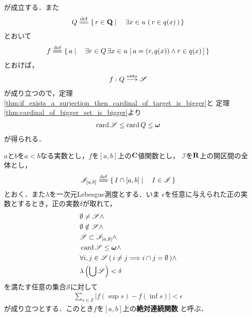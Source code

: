 \begin{sketch}
		が成立する．また
		\begin{align}
			Q \defeq \Set{r \in \Q}{\exists x \in u\, \left(\, r \in q(x)\, \right)}
		\end{align}
		とおいて
		\begin{align}
			f \defeq \Set{a}{\exists r \in Q \, \exists x \in u\, \left[\, a = (r,q(x)) \wedge r \in q(x)\, \right]}
		\end{align}
		とおけば，
		\begin{align}
			f: Q \overset{\mathrm{onto}}{\longrightarrow} \mathscr{S}
		\end{align}
		が成り立つので，定理\ref{thm:if_exists_a_surjection_then_cardinal_of_target_is_bigger}と
		定理\ref{thm:cardinal_of_bigger_set_is_bigger}より
		\begin{align}
			\operatorname{card} \mathscr{S} \leq \operatorname{card} Q \leq {\boldsymbol \omega}
		\end{align}
		が得られる．
		\QED
	\end{sketch}
	
	\begin{screen}
		\begin{dfn}[絶対連続関数]
			$a$と$b$を$a < b$なる実数とし，$f$を$[a,b]$上の$\mathbf{C}$値関数とし，
			$\mathscr{I}$を$\mathbf{R}$上の開区間の全体とし，
			\begin{align}
				\mathscr{I}_{[a,b]} \defeq \Set{I \cap [a,b]}{I \in \mathscr{I}}
			\end{align}
			とおく．また$\lambda$を一次元Lebesgue測度とする．いま
			$\epsilon$を任意に与えられた正の実数とするとき，正の実数$\delta$が取れて，
			\begin{align}
				&\emptyset \neq \mathscr{S} \wedge \\
				&\emptyset \notin \mathscr{S} \wedge \\
				&\mathscr{S} \subset \mathscr{I}_{[a,b]} \wedge \\
				&\operatorname{card} \mathscr{S} \leq {\boldsymbol \omega} \wedge \\
				&\forall i,j \in \mathscr{S}\, (\, i \neq j \Longrightarrow i \cap j = \emptyset\, ) \wedge \\
				&\lambda\left(\bigcup \mathscr{S}\right) < \delta
			\end{align}
			を満たす任意の集合$\mathscr{S}$に対して
			\begin{align}
				\sum_{s \in \mathscr{S}} |f(\sup{}{s}) - f(\inf{}{s})| < \epsilon
			\end{align}
			が成り立つとする．このとき$f$を$[a,b]$上の{\bf 絶対連続関数}
			と呼ぶ．
		\end{dfn}
	\end{screen}
	
